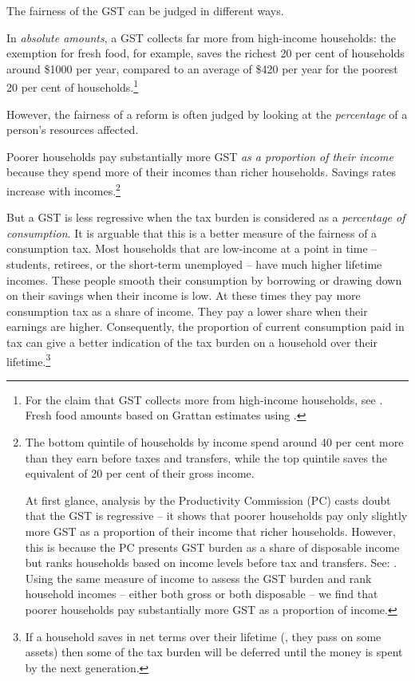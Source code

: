 The fairness of the GST can be judged in different ways. 

In \emph{absolute amounts}, a GST collects far more from high-income households:
the exemption for fresh food, for example, saves the richest 20 per cent of households around \$1000 per year, compared to an average of \$420 per year for the poorest 20 per cent of households.\footnote{For the claim that GST collects more from high-income households, see \textcites{OECDKoreaInstitutePublicFinance2014-Distributional-Effects-Consumption-Taxes}{Freebairn2013}{HenryTaxReview2010}. Fresh food amounts based on Grattan estimates using \textcites{Treasury2015TES2014}{ABS2011HES0910curf}.}

However, the fairness of a reform is often judged by looking at the \emph{percentage} of a person’s resources affected.  

Poorer households pay substantially more GST \emph{as a proportion of their income} because they spend more of their incomes than richer households. Savings rates increase with incomes.\footnote{The bottom quintile of households by income spend around 40 per cent more than they earn before taxes and transfers, while the top quintile saves the equivalent of 20 per cent of their gross income. 

At first glance, analysis by the Productivity Commission (PC) casts doubt that the GST is regressive  – it shows that poorer households pay only slightly more GST as a proportion of their income that richer households. However, this is because the PC presents GST burden as a share of disposable income but ranks households based on income levels before tax and transfers. See: \textcite[][74--76]{ProductivityCommission2015-Tax-and-transfer-incidence}.  Using the same measure of income to assess the GST burden and rank household incomes – either both gross or both disposable – we find that poorer households pay substantially more GST as a proportion of income.
}

But a GST is less regressive when the tax burden is considered as a \emph{percentage of consumption}. It is arguable that this is a better measure of the fairness of a consumption tax. Most households that are low-income at a point in time – students, retirees, or the short-term unemployed – have much higher lifetime incomes. These people smooth their consumption by borrowing or drawing down on their savings when their income is low. At these times they pay more consumption tax as a share of income. They pay a lower share when their earnings are higher. Consequently, the proportion of current consumption paid in tax can give a better indication of the tax burden on a household over their lifetime.\footnote{\textcites[][275]{HenryTaxReview2010}[][34--36]{OECDKoreaInstitutePublicFinance2014-Distributional-Effects-Consumption-Taxes} If a household saves in net terms over their lifetime (\ie, they pass on some assets) then some of the tax burden will be deferred until the money is spent by the next generation.}

